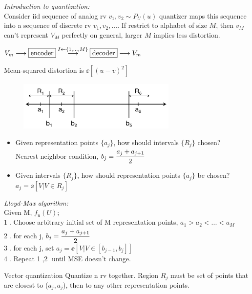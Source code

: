 \documentclass[12pt,a4paper]{article}
\begin{document}
\textit{Introduction to quantization:} \\
Consider iid sequence of analog rv $v_1, v_2\sim P_U(u)$ quantizer maps this sequence into a sequence of discrete rv $v_1,v_2,...$. If restrict to alphabet of size $M$, then $v_M$ can't represent $V_M$ perfectly on general, larger $M$ implies less distortion. 

$V_m\longrightarrow \fbox{encoder} \overset{I\leftarrow\{1,...,M\}}{\longrightarrow} \fbox{decoder} \longrightarrow V_m$

Mean-squared distortion is $\ee[(u-v)^2]$

\vspace{2cm}
\begin{figure}[!ht]
    \centering
    \includegraphics[width=0.7\textwidth]{fig/vae_quant.png}
\end{figure}

\begin{itemize}
\item Given representation points $\{a_j\}$, how should intervals $\{R_j\}$ chosen? \\
Nearest neighbor condition, $b_j=\cfrac{a_j+a_{j+1}}{2}$
\item Given intervals $\{R_j\}$, how should representation points $\{a_j\}$ be chosen? \\
$a_j=\ee[V|V\in R_j]$
\end{itemize}

\textit{Lloyd-Max algorithm:}\\
Given M, $f_u(U)$;\\
\textcircled{1}. Choose arbitrary initial set of M representation points, $a_1>a_2<...<a_M$\\
\textcircled{2}. for each j, $b_j=\cfrac{a_j+a_{j+1}}{2}$\\
\textcircled{3}. for each j, set $a_j=\ee[V|V\in [b_{j-1}, b_j]]$\\
\textcircled{4}. Repeat \textcircled{1},\textcircled{2} until MSE doesn't change.

\vspace{0.5cm}
Vector quantization
Quantize n rv together. Region $R_j$ must be set of points that are closest to ($a_j, a_j$), then to any other representation points.
\end{document}
